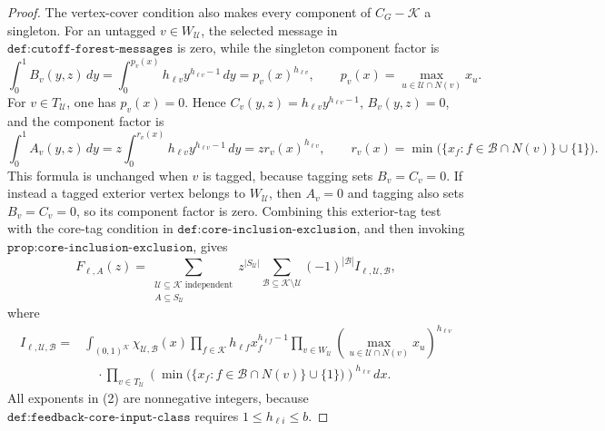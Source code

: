 \documentclass{article}
\begin{document}
\begin{proof}
The vertex-cover condition also makes every component of \(C_G-\mathcal K\) a singleton.  For an untagged \(v\in W_{\mathcal U}\), the selected message in \(\texttt{def:cutoff-forest-messages}\) is zero, while the singleton component factor is
\[
 \int_0^1 B_v(y,z)\,dy
 =\int_0^{p_v(x)}h_{\ell v}y^{h_{\ell v}-1}\,dy
 =p_v(x)^{h_{\ell v}},
 \qquad
 p_v(x)=\max_{u\in\mathcal U\cap N(v)}x_u.
\]
For \(v\in T_{\mathcal U}\), one has \(p_v(x)=0\).  Hence \(C_v(y,z)=h_{\ell v}y^{h_{\ell v}-1}\), \(B_v(y,z)=0\), and the component factor is
\[
 \int_0^1 A_v(y,z)\,dy
 =z\int_0^{r_v(x)}h_{\ell v}y^{h_{\ell v}-1}\,dy
 =z r_v(x)^{h_{\ell v}},
 \qquad
 r_v(x)=\min\bigl(\{x_f:f\in\mathcal B\cap N(v)\}\cup\{1\}\bigr).
\]
This formula is unchanged when \(v\) is tagged, because tagging sets \(B_v=C_v=0\).  If instead a tagged exterior vertex belongs to \(W_{\mathcal U}\), then \(A_v=0\) and tagging also sets \(B_v=C_v=0\), so its component factor is zero.  Combining this exterior-tag test with the core-tag condition in \(\texttt{def:core-inclusion-exclusion}\), and then invoking \(\texttt{prop:core-inclusion-exclusion}\), gives
\[
 F_{\ell,A}(z)
 =\sum_{\substack{\mathcal U\subseteq\mathcal K\text{ independent}\\ A\subseteq S_{\mathcal U}}}
 z^{|S_{\mathcal U}|}
 \sum_{\mathcal B\subseteq\mathcal K\setminus\mathcal U}
 (-1)^{|\mathcal B|} I_{\ell,\mathcal U,\mathcal B},                         \tag{1}
\]
where
\[
\begin{split}
 I_{\ell,\mathcal U,\mathcal B}
 ={}&\int_{(0,1)^{\mathcal K}}
 \chi_{\mathcal U,\mathcal B}(x)
 \prod_{f\in\mathcal K}h_{\ell f}x_f^{h_{\ell f}-1}
 \prod_{v\in W_{\mathcal U}}
 \left(\max_{u\in\mathcal U\cap N(v)}x_u\right)^{h_{\ell v}}\\
 &\quad\cdot
 \prod_{v\in T_{\mathcal U}}
 \left(\min\bigl(\{x_f:f\in\mathcal B\cap N(v)\}\cup\{1\}\bigr)\right)^{h_{\ell v}}\,dx .       \tag{2}
\end{split}
\]
All exponents in (2) are nonnegative integers, because \(\texttt{def:feedback-core-input-class}\) requires \(1\leq h_{\ell i}\leq b\).


\end{proof}
\end{document}
